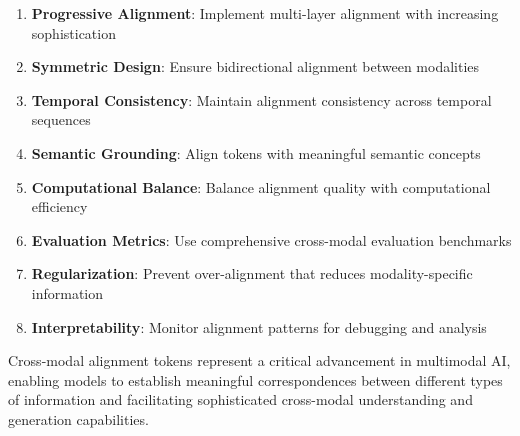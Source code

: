 \begin{enumerate}
\item \textbf{Progressive Alignment}: Implement multi-layer alignment with increasing sophistication
\item \textbf{Symmetric Design}: Ensure bidirectional alignment between modalities
\item \textbf{Temporal Consistency}: Maintain alignment consistency across temporal sequences
\item \textbf{Semantic Grounding}: Align tokens with meaningful semantic concepts
\item \textbf{Computational Balance}: Balance alignment quality with computational efficiency
\item \textbf{Evaluation Metrics}: Use comprehensive cross-modal evaluation benchmarks
\item \textbf{Regularization}: Prevent over-alignment that reduces modality-specific information
\item \textbf{Interpretability}: Monitor alignment patterns for debugging and analysis
\end{enumerate}

Cross-modal alignment tokens represent a critical advancement in multimodal AI, enabling models to establish meaningful correspondences between different types of information and facilitating sophisticated cross-modal understanding and generation capabilities.
